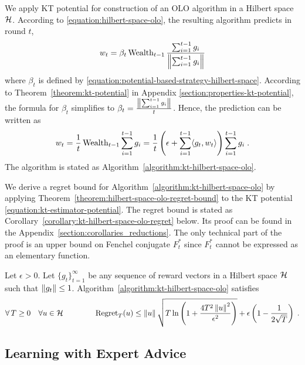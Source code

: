 We apply KT potential for construction of an OLO algorithm in a Hilbert
space $\mathcal{H}$. According to \eqref{equation:hilbert-space-olo}, the resulting algorithm predicts
in round $t$,
$$
w_t = \beta_t \operatorname{Wealth}_{t-1} \frac{\sum_{i=1}^{t-1} g_i}{\left\|{\sum_{i=1}^{t-1} g_i}\right\|}
$$
where $\beta_t$ is defined by
\eqref{equation:potential-based-strategy-hilbert-space}. According to
Theorem~\ref{theorem:kt-potential} in Appendix
\ref{section:properties-kt-potential}, the formula for $\beta_t$ simplifies to
$\beta_t = \frac{\left\|{\sum_{i=1}^{t-1} g_i}\right\|}{t}$. Hence, the prediction can be
written as
$$
w_t
= \frac{1}{t} \operatorname{Wealth}_{t-1} \sum_{i=1}^{t-1} g_i
= \frac{1}{t} \left(\epsilon + \sum_{i=1}^{t-1} \langle g_t, w_t \rangle \right) \sum_{i=1}^{t-1} g_i \; .
$$
The algorithm is stated as Algorithm~\ref{algorithm:kt-hilbert-space-olo}.

We derive a regret bound for Algorithm~\ref{algorithm:kt-hilbert-space-olo} by
applying Theorem~\ref{theorem:hilbert-space-olo-regret-bound} to the KT
potential \eqref{equation:kt-estimator-potential}. The regret bound is stated as
Corollary~\ref{corollary:kt-hilbert-space-olo-regret} below. Its proof can be
found in the Appendix~\ref{section:corollaries_reductions}. The only technical part of the
proof is an upper bound on Fenchel conjugate $F_t^*$ since $F_t^*$ cannot be
expressed as an elementary function.

\begin{corollary}
\label{corollary:kt-hilbert-space-olo-regret}
Let $\epsilon > 0$. Let $\{g_t\}_{t=1}^\infty$ be any sequence of reward vectors
in a Hilbert space $\mathcal{H}$ such that $\left\|{g_t}\right\| \le 1$.
Algorithm~\ref{algorithm:kt-hilbert-space-olo} satisfies
$$
\forall \, T \ge 0 \quad
\forall u \in \mathcal{H} \qquad \qquad
\operatorname{Regret}_T(u) \le \left\|{u}\right\| \sqrt{T \ln\left(1 + \frac{4T^2 \left\|{u}\right\|^2}{\epsilon^2} \right)} + \epsilon \left(1 - \frac{1}{2\sqrt{T}} \right) \;.
$$
\end{corollary}

\subsection{Learning with Expert Advice}

